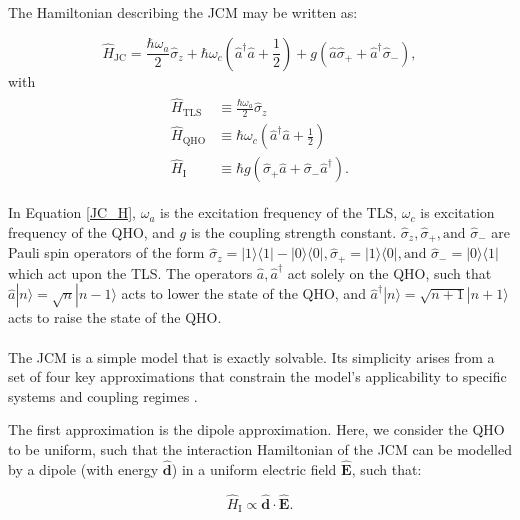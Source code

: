 \documentclass[11pt]{article}
\begin{document}
\noindent The Hamiltonian describing the JCM may be written as:

\begin{equation} \label{JC_H}
    \hat{H}_{\scriptscriptstyle \text{JC}} = \frac{\hbar\omega_a}{2}\hat{\sigma}_z + \hbar\omega_c\left(\hat{a}^\dagger \hat{a} + \frac{1}{2} \right) + g(\hat{a}\hat{\sigma}_{+} + \hat{a}^\dagger\hat{\sigma}_{-}), 
\end{equation} 
with 
\begin{align*}
    \begin{aligned}
        \hat{H}_{\scriptscriptstyle \text{TLS}} &\equiv \frac{\hbar\omega_a}{2}\hat{\sigma}_z \\
        \hat{H}_{\scriptscriptstyle \text{QHO}} &\equiv \hbar\omega_c\left(\hat{a}^\dagger \hat{a} + \frac{1}{2} \right) \\
        \hat{H}_{\scriptscriptstyle \text{I}} &\equiv \hbar g(\hat{\sigma}_{+}\hat{a} +\hat{\sigma}_{-}\hat{a}^\dagger).
    \end{aligned}
\end{align*}

In Equation \eqref{JC_H}, $\omega_a$ is the excitation frequency of the TLS, $\omega_c$ is excitation frequency of the QHO, and $g$ is the coupling strength constant. $\hat{\sigma}_z, \hat{\sigma}_+, \text{and } \hat{\sigma}_-$ are Pauli spin operators of the form $\hat{\sigma}_z = |1\rangle\langle1| - |0\rangle\langle0|, \hat{\sigma}_+ = |1\rangle\langle0|, \text{and } \hat{\sigma}_- = |0\rangle\langle1|$ which act upon the TLS. The operators $\hat{a}, \hat{a}^\dagger$ act solely on the QHO, such that $\hat{a}|n\rangle = \sqrt{n}|n-1\rangle$ acts to lower the state of the QHO, and $\hat{a}^{\dagger}|n\rangle = \sqrt{n+1}|n+1\rangle$ acts to raise the state of the QHO.\\
\\
The JCM is a simple model that is exactly solvable. Its simplicity arises from a set of four key approximations that constrain the model’s applicability to specific systems and coupling regimes \cite{General2024-JC_overview}. 

The first approximation is the dipole approximation. Here, we consider the QHO to be uniform, such that the interaction Hamiltonian of the JCM can be modelled by a dipole (with energy $\boldsymbol{\hat{d}}$) in a uniform electric field $\boldsymbol{\hat{E}}$, such that:

\begin{equation*}
    \hat{H}_{\scriptscriptstyle \text{I}} \propto \boldsymbol{\hat{d}} \cdot \boldsymbol{\hat{E}}.
\end{equation*}
\end{document}
